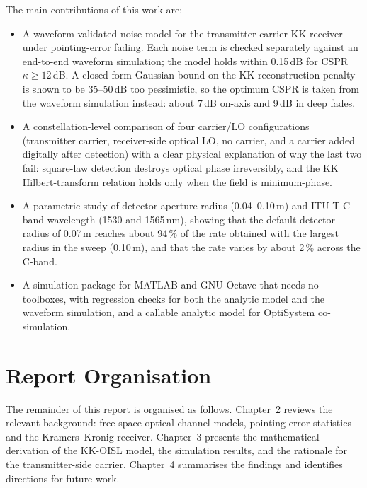The main contributions of this work are:

\begin{itemize}
\item A waveform-validated noise model for the transmitter-carrier KK receiver under pointing-error fading. Each noise term is checked separately against an end-to-end waveform simulation; the model holds within 0.15\,dB for CSPR $\kappa\ge12$\,dB. A closed-form Gaussian bound on the KK reconstruction penalty is shown to be 35--50\,dB too pessimistic, so the optimum CSPR is taken from the waveform simulation instead: about 7\,dB on-axis and 9\,dB in deep fades.

\item A constellation-level comparison of four carrier/LO configurations (transmitter carrier, receiver-side optical LO, no carrier, and a carrier added digitally after detection) with a clear physical explanation of why the last two fail: square-law detection destroys optical phase irreversibly, and the KK Hilbert-transform relation holds only when the field is minimum-phase.

\item A parametric study of detector aperture radius (0.04--0.10\,m) and ITU-T C-band wavelength (1530 and 1565\,nm), showing that the default detector radius of 0.07\,m reaches about 94\,\% of the rate obtained with the largest radius in the sweep (0.10\,m), and that the rate varies by about 2\,\% across the C-band.

\item A simulation package for MATLAB and GNU Octave that needs no toolboxes, with regression checks for both the analytic model and the waveform simulation, and a callable analytic model for OptiSystem co-simulation.
\end{itemize}

\section{Report Organisation}

The remainder of this report is organised as follows. Chapter~2 reviews the relevant background: free-space optical channel models, pointing-error statistics and the Kramers--Kronig receiver. Chapter~3 presents the mathematical derivation of the KK-OISL model, the simulation results, and the rationale for the transmitter-side carrier. Chapter~4 summarises the findings and identifies directions for future work.
